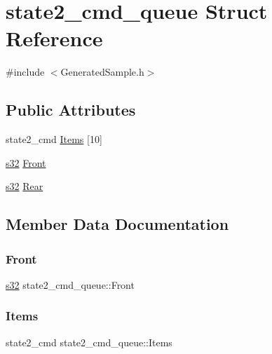 \hypertarget{structstate2__cmd__queue}{}\section{state2\+\_\+cmd\+\_\+queue Struct Reference}
\label{structstate2__cmd__queue}


{\ttfamily \#include $<$Generated\+Sample.\+h$>$}

\subsection*{Public Attributes}
\begin{DoxyCompactItemize}
\item 
state2\+\_\+cmd \hyperlink{structstate2__cmd__queue_afe743bb71aaae1d2dd528c63b01d1043}{Items} \mbox{[}10\mbox{]}
\item 
\hyperlink{ab__common_8h_ae9b1af5c037e57a98884758875d3a7c4}{s32} \hyperlink{structstate2__cmd__queue_a9b97a95eea73647be7630841ca5f3124}{Front}
\item 
\hyperlink{ab__common_8h_ae9b1af5c037e57a98884758875d3a7c4}{s32} \hyperlink{structstate2__cmd__queue_a3417bc9526018e0f80aafdf292491ab0}{Rear}
\end{DoxyCompactItemize}


\subsection{Member Data Documentation}
\mbox{\label{structstate2__cmd__queue_a9b97a95eea73647be7630841ca5f3124}} 
\subsubsection{\texorpdfstring{Front}{Front}}
{\footnotesize\ttfamily \hyperlink{ab__common_8h_ae9b1af5c037e57a98884758875d3a7c4}{s32} state2\+\_\+cmd\+\_\+queue\+::\+Front}

\mbox{\label{structstate2__cmd__queue_afe743bb71aaae1d2dd528c63b01d1043}} 
\subsubsection{\texorpdfstring{Items}{Items}}
{\footnotesize\ttfamily state2\+\_\+cmd state2\+\_\+cmd\+\_\+queue\+::\+Items}

